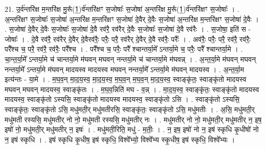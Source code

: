\documentclass[17pt]{extarticle}
\begin{document}
21. उ॒र्व॑न्तरि॑क्ष म॒न्तरि॑क्ष मु॒रू᳚(1॒)र्व॑न्तरि॑क्षꣳ स॒जोषाः᳚ स॒जोषा॑ अ॒न्तरि॑क्ष मु॒रू᳚(1॒)र्व॑न्तरि॑क्षꣳ स॒जोषाः᳚ । . अ॒न्तरि॑क्षꣳ स॒जोषाः᳚ स॒जोषा॑ अ॒न्तरि॑क्ष म॒न्तरि॑क्षꣳ स॒जोषा॑ दे॒वैर् दे॒वैः स॒जोषा॑ अ॒न्तरि॑क्ष म॒न्तरि॑क्षꣳ स॒जोषा॑ दे॒वैः । . स॒जोषा॑ दे॒वैर् दे॒वैः स॒जोषाः᳚ स॒जोषा॑ दे॒वै रव॑रै॒ रव॑रैर् दे॒वैः स॒जोषाः᳚ स॒जोषा॑ दे॒वै रव॑रैः । . स॒जोषा॒ इति॑ स - जोषाः᳚ । . दे॒वै रव॑रै॒ रव॑रैर् दे॒वैर् दे॒वैरव॑रैः॒ परैः॒ परै॒ रव॑रैर् दे॒वैर् दे॒वै रव॑रैः॒ परैः᳚ । . अव॑रैः॒ परैः॒ परै॒ रव॑रै॒ रव॑रैः॒ परै᳚श्च च॒ परै॒ रव॑रै॒ रव॑रैः॒ परै᳚श्च । . परै᳚श्च च॒ परैः॒ परै᳚ श्चान्तर्या॒मे᳚ ऽन्तर्या॒मे च॒ परैः॒ परै᳚ श्चान्तर्या॒मे । . चा॒न्त॒र्या॒मे᳚ ऽन्तर्या॒मे च॑ चान्तर्या॒मे म॑घवन् मघवन् नन्तर्या॒मे च॑ चान्तर्या॒मे म॑घवन्न् । . अ॒न्त॒र्या॒मे म॑घवन् मघवन् नन्तर्या॒मे᳚ ऽन्तर्या॒मे म॑घवन् मादयस्व मादयस्व मघवन् नन्तर्या॒मे᳚ ऽन्तर्या॒मे म॑घवन् मादयस्व । . अ॒न्त॒र्या॒म इत्य॑न्तः - या॒मे । . म॒घ॒व॒न् मा॒द॒य॒स्व॒ मा॒द॒य॒स्व॒ म॒घ॒व॒न् म॒घ॒व॒न् मा॒द॒य॒स्व॒ स्वाङ्कृ॑तः॒ स्वाङ्कृ॑तो मादयस्व मघवन् मघवन् मादयस्व॒ स्वाङ्कृ॑तः । . म॒घ॒व॒न्निति॑ मघ - व॒न्न् । . मा॒द॒य॒स्व॒ स्वाङ्कृ॑तः॒ स्वाङ्कृ॑तो मादयस्व मादयस्व॒ स्वाङ्कृ॑तो ऽस्यसि॒ स्वाङ्कृ॑तो मादयस्व मादयस्व॒ स्वाङ्कृ॑तो ऽसि । . स्वाङ्कृ॑तो ऽस्यसि॒ स्वाङ्कृ॑तः॒ स्वाङ्कृ॑तो ऽसि॒ मधु॑मती॒र् मधु॑मतीरसि॒ स्वाङ्कृ॑तः॒ स्वाङ्कृ॑तो ऽसि॒ मधु॑मतीः । . अ॒सि॒ मधु॑मती॒र् मधु॑मती रस्यसि॒ मधु॑मतीर् नो नो॒ मधु॑मती रस्यसि॒ मधु॑मतीर् नः । . मधु॑मतीर् नो नो॒ मधु॑मती॒र् मधु॑मतीर् न॒ इष॒ इषो॑ नो॒ मधु॑मती॒र् मधु॑मतीर् न॒ इषः॑ । . मधु॑मती॒रिति॒ मधु॑ - म॒तीः॒ । . न॒ इष॒ इषो॑ नो न॒ इष॑ स्कृधि कृ॒धीषो॑ नो न॒ इष॑ स्कृधि । . इष॑ स्कृधि कृ॒धीष॒ इष॑ स्कृधि॒ विश्वे᳚भ्यो॒ विश्वे᳚भ्य स्कृ॒धीष॒ इष॑ स्कृधि॒ विश्वे᳚भ्यः । \newline
\end{document}
